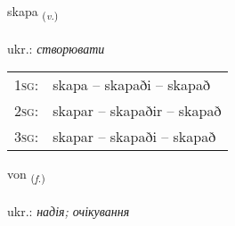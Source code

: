 \documentclass[frontgrid, backgrid]{flacards}\usepackage[]{graphicx}\usepackage[]{xcolor}
\begin{document}
\renewcommand{\flhead}{\vskip5pt \fboxsep=0pt {\small\bfseries\footnotesize Sagnorð | дієслово}}
\renewcommand{\fcfoot}{\vskip5pt \fboxsep=0pt \hspace{2pt}{\small\bfseries\footnotesize 1K}}

\renewcommand{\blhead}{\vskip5pt {\small\bfseries\footnotesize Sagnorð | дієслово }}
\renewcommand{\bcfoot}{\vskip5pt \hspace{2pt}{\small\bfseries\footnotesize 1K}}


{skapa \small{\textsubscript{(\textit{v.})}} \\[1ex] %
\textphonetic{[skaːpa]} \\
ukr.: \emph{створювати} \\  [2ex]
\renewcommand*{\arraystretch}{0.8}
\begin{tabular}{p{1cm}l}
\textsc{1sg}: & skapa -- skapaði -- skapað \\ 
\textsc{2sg}: & skapar -- skapaðir -- skapað \\ 
\textsc{3sg}: & skapar -- skapaði -- skapað \\ 
\end{tabular}
}

\renewcommand{\flhead}{\vskip5pt \fboxsep=0pt {\small\bfseries\footnotesize Nafnorð | іменник}}
\renewcommand{\fcfoot}{\vskip5pt \fboxsep=0pt \hspace{2pt}{\small\bfseries\footnotesize 1K}}

\renewcommand{\blhead}{\vskip5pt {\small\bfseries\footnotesize Nafnorð | іменник }}
\renewcommand{\bcfoot}{\vskip5pt \hspace{2pt}{\small\bfseries\footnotesize 1K}}


{von \small{\textsubscript{(\textit{f.})}} \\[1ex] %
\textphonetic{[vɔːn]} \\
ukr.: \emph{надія; очікування} \\  [2ex]
\renewcommand*{\arraystretch}{0.8}
}
\end{document}
